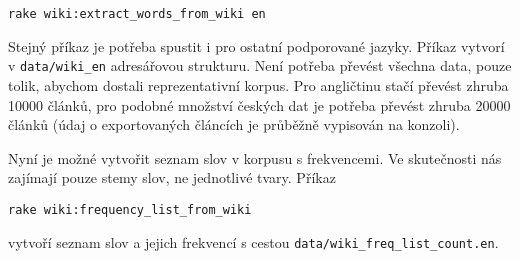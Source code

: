 \begin{lstlisting}
rake wiki:extract_words_from_wiki en
\end{lstlisting}

Stejný příkaz je potřeba spustit i pro ostatní podporované jazyky. Příkaz vytvorí v \lstinline{data/wiki_en} adresářovou strukturu. Není potřeba převést všechna data, pouze tolik, abychom dostali reprezentativní korpus. Pro angličtinu stačí převést zhruba 10000 článků, pro podobné množství českých dat je potřeba převést zhruba 20000 článků (údaj o exportovaných článcích je průběžně vypisován na konzoli).

Nyní je možné vytvořit seznam slov v korpusu s frekvencemi. Ve skutečnosti nás zajímají pouze stemy slov, ne jednotlivé tvary. Příkaz

\begin{lstlisting}
rake wiki:frequency_list_from_wiki
\end{lstlisting}

vytvoří seznam slov a jejich frekvencí s cestou \lstinline{data/wiki_freq_list_count.en}.




